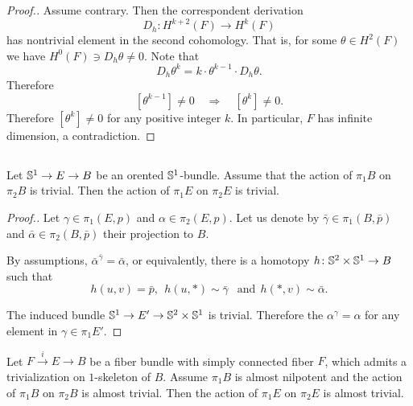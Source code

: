 \documentclass{amsart}
\begin{document}
\begin{proof}[Proof.] Assume contrary. 
Then  the correspondent derivation 
$$D_h\colon H^{k+2}(F)\to H^{k}(F)$$
 has nontrivial element in the second cohomology.
That is, for some 
$\theta\in H^2(F)$ we have $H^0(F)\ni D_h\theta\not=0$.
Note that \[D_h\theta^k=k\cdot \theta^{k-1}\cdot D_h\theta.\] 
Therefore 
\[[\theta^{k-1}]\ne0
\quad
\Longrightarrow
\quad[\theta^{k}]\ne0.\]
Therefore $[\theta^{k}]\not=0$ for any positive integer $k$.
In particular, $F$ has infinite dimension, a contradiction. 
\end{proof}


\subsection{}

\begin{claim}
Let ${\Bbb S}^1\to E\to B$ be an orented ${\Bbb S}^1$-bundle.
Assume that the action of $\pi_1B$ 
on $\pi_2B$ is trivial. 
Then  the action of $\pi_1E$ on $\pi_2E$ is trivial.
\end{claim}

\begin{proof}[Proof.] 
Let $\gamma\in \pi_1(E,p)$ and $\alpha\in \pi_2(E,p)$. 
Let us denote by $\bar\gamma\in \pi_1(B,\bar p)$ and 
$\bar\alpha\in \pi_2(B,\bar p)$ their projection to $B$.

By assumptions, $\bar\alpha^{\bar\gamma}=\bar\alpha$, or equivalently, there is a homotopy 
$h\colon {\Bbb S}^2\times {\Bbb S}^1\to B$ such that 
$$h(u,v)=\bar p,\ \ 
h(u,*)\sim\bar\gamma\ \ \text{ and}\ \ 
h(*,v)\sim\bar\alpha.$$

The induced bundle ${\Bbb S}^1\to E'\to {\Bbb S}^2\times {\Bbb S}^1$ is trivial. 
Therefore the $\alpha^\gamma=\alpha$ 
for any element in $\gamma\in \pi_1E'$.
\end{proof}

\begin{claim}
Let $F\xrightarrow{i} E\to B$ be a fiber bundle with 
simply connected fiber $F$, which admits a trivialization on $1$-skeleton of $B$. Assume $\pi_1B$ is almost nilpotent 
and the action of $\pi_1B$ on $\pi_2B$ is almost trivial. 
Then  the action of $\pi_1E$ on $\pi_2E$ is almost trivial.
\end{claim}
\end{document}
